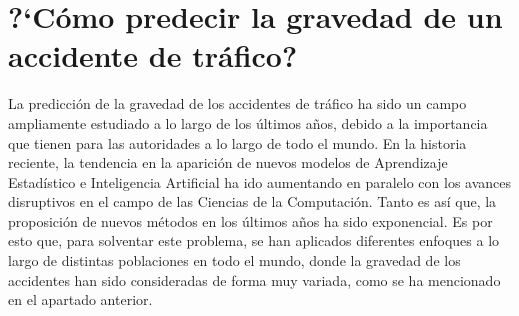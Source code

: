 

\section{?`Cómo predecir la gravedad de un accidente de tráfico?}





La predicción de la gravedad de los accidentes de tráfico ha sido un campo ampliamente estudiado a lo largo de los últimos años, debido a la importancia que tienen para las autoridades a lo largo de todo el mundo. En la historia reciente, la tendencia en la aparición de nuevos modelos de Aprendizaje Estadístico e Inteligencia Artificial ha ido aumentando en paralelo con los avances disruptivos en el campo de las Ciencias de la Computación. Tanto es así que, la proposición de nuevos métodos en los últimos años ha sido exponencial. Es por esto que, para solventar este problema, se han aplicados diferentes enfoques a lo largo de distintas poblaciones en todo el mundo, donde la gravedad de los accidentes han sido consideradas de forma muy variada, como se ha mencionado en el apartado anterior.

